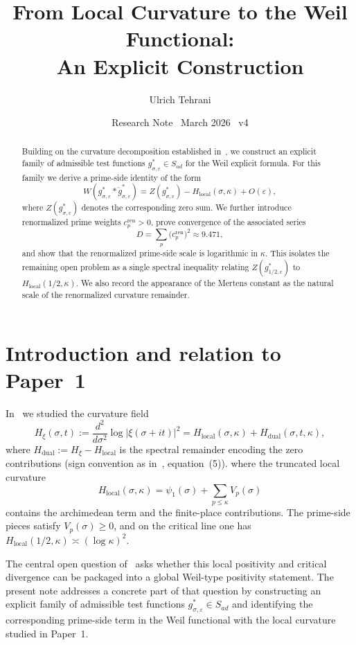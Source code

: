 \documentclass[11pt]{article}
\title{\vspace{-1.5em}\bfseries
From Local Curvature to the Weil Functional:\\[0.4em]
\large An Explicit Construction}
\author{Ulrich Tehrani}
\date{Research Note \textperiodcentered\ March 2026 \textperiodcentered\ v4}
\begin{document}
\maketitle

\begin{abstract}
Building on the curvature decomposition established in~\cite{paper1},
we construct an explicit family of admissible test functions
$g^*_{\sigma,\varepsilon} \in S_{ad}$ for the Weil explicit formula.
For this family we derive a prime-side identity of the form
\[
W(g^*_{\sigma,\varepsilon} * \check g^*_{\sigma,\varepsilon})
=
Z(g^*_{\sigma,\varepsilon}) - H_{\mathrm{local}}(\sigma,\kappa) + O(\varepsilon),
\]
where $Z(g^*_{\sigma,\varepsilon})$ denotes the corresponding zero sum.
We further introduce renormalized prime weights
$c_p^{\mathrm{ren}} > 0$, prove convergence of the associated series
\[
D = \sum_p \bigl(c_p^{\mathrm{ren}}\bigr)^2 \approx 9.471,
\]
and show that the renormalized prime-side scale is logarithmic in $\kappa$.
This isolates the remaining open problem as a single spectral inequality
relating $Z(g^*_{1/2,\varepsilon})$ to $H_{\mathrm{local}}(1/2,\kappa)$.
We also record the appearance of the Mertens constant as the natural scale
of the renormalized curvature remainder.
\end{abstract}

\section{Introduction and relation to Paper~1}

In~\cite{paper1} we studied the curvature field
\[
H_{\xi}(\sigma,t)
:= \frac{d^2}{d\sigma^2}\log|\xi(\sigma+it)|^2
= H_{\mathrm{local}}(\sigma,\kappa) + H_{\mathrm{dual}}(\sigma,t,\kappa),
\]
where $H_{\mathrm{dual}} := H_{\xi} - H_{\mathrm{local}}$ is the spectral
remainder encoding the zero contributions (sign convention as in~\cite{paper1},
equation~(5)).
where the truncated local curvature
\[
H_{\mathrm{local}}(\sigma,\kappa) = \psi_1(\sigma)
+ \sum_{p\le\kappa} V_p(\sigma)
\]
contains the archimedean term and the finite-place contributions. The prime-side pieces satisfy
$V_p(\sigma) \ge 0$, and on the critical line one has
$H_{\mathrm{local}}(1/2,\kappa) \asymp (\log\kappa)^2$.

The central open question of~\cite[\S7]{paper1} asks whether this local
positivity and critical divergence can be packaged into a global
Weil-type positivity statement. The present note addresses a concrete part of
that question by constructing an explicit family of admissible test functions
$g^*_{\sigma,\varepsilon} \in S_{ad}$ and identifying the corresponding
prime-side term in the Weil functional with the local curvature studied in
Paper~1.
\end{document}
